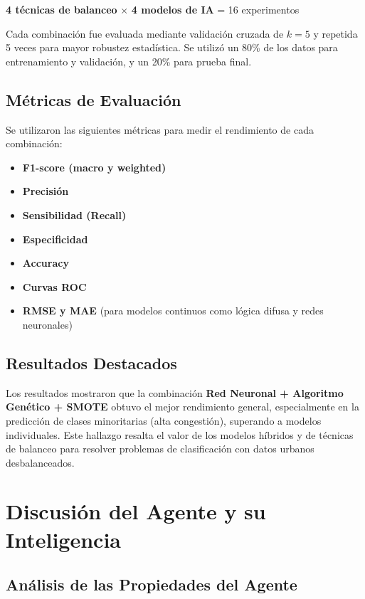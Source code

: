 \documentclass{svproc} %
\begin{document}
\begin{center}
\textbf{4 técnicas de balanceo} × \textbf{4 modelos de IA} = 16 experimentos
\end{center}

Cada combinación fue evaluada mediante validación cruzada de \( k = 5 \) y repetida 5 veces para mayor robustez estadística. Se utilizó un 80\% de los datos para entrenamiento y validación, y un 20\% para prueba final.

\subsection{Métricas de Evaluación}

Se utilizaron las siguientes métricas para medir el rendimiento de cada combinación:

\begin{itemize}
    \item \textbf{F1-score (macro y weighted)}
    \item \textbf{Precisión}
    \item \textbf{Sensibilidad (Recall)}
    \item \textbf{Especificidad}
    \item \textbf{Accuracy}
    \item \textbf{Curvas ROC}
    \item \textbf{RMSE y MAE} (para modelos continuos como lógica difusa y redes neuronales)
\end{itemize}

\subsection{Resultados Destacados}

Los resultados mostraron que la combinación \textbf{Red Neuronal + Algoritmo Genético + SMOTE} obtuvo el mejor rendimiento general, especialmente en la predicción de clases minoritarias (alta congestión), superando a modelos individuales. Este hallazgo resalta el valor de los modelos híbridos y de técnicas de balanceo para resolver problemas de clasificación con datos urbanos desbalanceados.

\section{Discusión del Agente y su Inteligencia}

\subsection{Análisis de las Propiedades del Agente}
\end{document}

